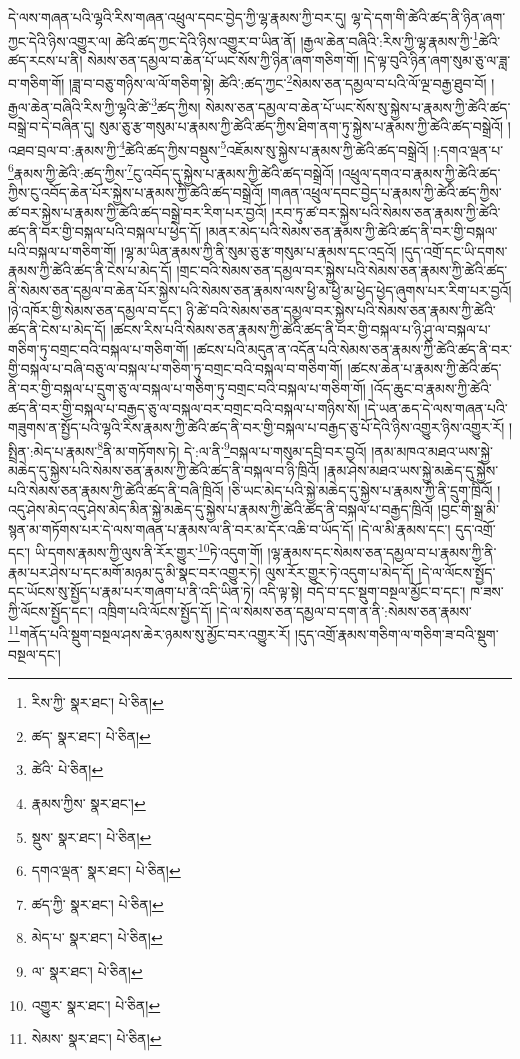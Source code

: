 དེ་ལས་གཞན་པའི་ལྷའི་རིས་གཞན་འཕྲུལ་དབང་བྱེད་ཀྱི་ལྷ་རྣམས་ཀྱི་བར་དུ། ལྷ་དེ་དག་གི་ཚེའི་ཚད་ནི་ཉིན་ཞག་ཀྱང་དེའི་ཉིས་འགྱུར་ལ། ཚེའི་ཚད་ཀྱང་དེའི་ཉིས་འགྱུར་བ་ཡིན་ནོ། །རྒྱལ་ཆེན་བཞིའི་:རིས་ཀྱི་ལྷ་རྣམས་ཀྱི་\footnote{རིས་ཀྱི་  སྣར་ཐང་།  པེ་ཅིན། }ཚེའི་ཚད་རངས་པ་ནི། སེམས་ཅན་དམྱལ་བ་ཆེན་པོ་ཡང་སོས་ཀྱི་ཉིན་ཞག་གཅིག་གོ། །དེ་ལྟ་བུའི་ཉིན་ཞག་སུམ་ཅུ་ལ་ཟླ་བ་གཅིག་གོ། །ཟླ་བ་བཅུ་གཉིས་ལ་ལོ་གཅིག་སྟེ། ཚེའི་:ཚད་ཀྱང་\footnote{ཚད་  སྣར་ཐང་།  པེ་ཅིན། }སེམས་ཅན་དམྱལ་བ་པའི་ལོ་ལྔ་བརྒྱ་ཐུབ་བོ། །རྒྱལ་ཆེན་བཞིའི་རིས་ཀྱི་ལྷའི་ཚེ་\footnote{ཚེའི་  པེ་ཅིན། }ཚད་ཀྱིས། སེམས་ཅན་དམྱལ་བ་ཆེན་པོ་ཡང་སོས་སུ་སྐྱེས་པ་རྣམས་ཀྱི་ཚེའི་ཚད་བསྒྲེ་བ་དེ་བཞིན་དུ། སུམ་ཅུ་རྩ་གསུམ་པ་རྣམས་ཀྱི་ཚེའི་ཚད་ཀྱིས་ཐིག་ནག་ཏུ་སྐྱེས་པ་རྣམས་ཀྱི་ཚེའི་ཚད་བསྒྲེའོ། །འཐབ་བྲལ་བ་:རྣམས་ཀྱི་\footnote{རྣམས་ཀྱིས་  སྣར་ཐང་། }ཚེའི་ཚད་ཀྱིས་བསྡུས་\footnote{སྡུས་  སྣར་ཐང་།  པེ་ཅིན། }འཇོམས་སུ་སྐྱེས་པ་རྣམས་ཀྱི་ཚེའི་ཚད་བསྒྲེའོ། །:དགའ་ལྡན་པ་\footnote{དགའ་ལྡན་  སྣར་ཐང་།  པེ་ཅིན། }རྣམས་ཀྱི་ཚེའི་:ཚད་ཀྱིས་\footnote{ཚད་ཀྱི་  སྣར་ཐང་།  པེ་ཅིན། }ངུ་འབོད་དུ་སྐྱེས་པ་རྣམས་ཀྱི་ཚེའི་ཚད་བསྒྲེའོ། །འཕྲུལ་དགའ་བ་རྣམས་ཀྱི་ཚེའི་ཚད་ཀྱིས་ངུ་འབོད་ཆེན་པོར་སྐྱེས་པ་རྣམས་ཀྱི་ཚེའི་ཚད་བསྒྲེའོ། །གཞན་འཕྲུལ་དབང་བྱེད་པ་རྣམས་ཀྱི་ཚེའི་ཚད་ཀྱིས་ཚ་བར་སྐྱེས་པ་རྣམས་ཀྱི་ཚེའི་ཚད་བསྒྲེ་བར་རིག་པར་བྱའོ། །རབ་ཏུ་ཚ་བར་སྐྱེས་པའི་སེམས་ཅན་རྣམས་ཀྱི་ཚེའི་ཚད་ནི་བར་གྱི་བསྐལ་པའི་བསྐལ་པ་ཕྱེད་དོ། །མནར་མེད་པའི་སེམས་ཅན་རྣམས་ཀྱི་ཚེའི་ཚད་ནི་བར་གྱི་བསྐལ་པའི་བསྐལ་པ་གཅིག་གོ། །ལྷ་མ་ཡིན་རྣམས་ཀྱི་ནི་སུམ་ཅུ་རྩ་གསུམ་པ་རྣམས་དང་འདྲའོ། །དུད་འགྲོ་དང་ཡི་དགས་རྣམས་ཀྱི་ཚེའི་ཚད་ནི་ངེས་པ་མེད་དོ། །གྲང་བའི་སེམས་ཅན་དམྱལ་བར་སྐྱེས་པའི་སེམས་ཅན་རྣམས་ཀྱི་ཚེའི་ཚད་ནི་སེམས་ཅན་དམྱལ་བ་ཆེན་པོར་སྐྱེས་པའི་སེམས་ཅན་རྣམས་ལས་ཕྱི་མ་ཕྱི་མ་ཕྱེད་ཕྱེད་ཞུགས་པར་རིག་པར་བྱའོ། །ཉེ་འཁོར་གྱི་སེམས་ཅན་དམྱལ་བ་དང་། ཉི་ཚེ་བའི་སེམས་ཅན་དམྱལ་བར་སྐྱེས་པའི་སེམས་ཅན་རྣམས་ཀྱི་ཚེའི་ཚད་ནི་ངེས་པ་མེད་དོ། །ཚངས་རིས་པའི་སེམས་ཅན་རྣམས་ཀྱི་ཚེའི་ཚད་ནི་བར་གྱི་བསྐལ་པ་ཉི་ཤུ་ལ་བསྐལ་པ་གཅིག་ཏུ་བགྲང་བའི་བསྐལ་པ་གཅིག་གོ། །ཚངས་པའི་མདུན་ན་འདོན་པའི་སེམས་ཅན་རྣམས་ཀྱི་ཚེའི་ཚད་ནི་བར་གྱི་བསྐལ་པ་བཞི་བཅུ་ལ་བསྐལ་པ་གཅིག་ཏུ་བགྲང་བའི་བསྐལ་བ་གཅིག་གོ། །ཚངས་ཆེན་པ་རྣམས་ཀྱི་ཚེའི་ཚད་ནི་བར་གྱི་བསྐལ་པ་དྲུག་ཅུ་ལ་བསྐལ་པ་གཅིག་ཏུ་བགྲང་བའི་བསྐལ་པ་གཅིག་གོ། །འོད་ཆུང་བ་རྣམས་ཀྱི་ཚེའི་ཚད་ནི་བར་གྱི་བསྐལ་པ་བརྒྱད་ཅུ་ལ་བསྐལ་བར་བགྲང་བའི་བསྐལ་པ་གཉིས་སོ། །དེ་ཡན་ཆད་དེ་ལས་གཞན་པའི་གཟུགས་ན་སྤྱོད་པའི་ལྷའི་རིས་རྣམས་ཀྱི་ཚེའི་ཚད་ནི་བར་གྱི་བསྐལ་པ་བརྒྱད་ཅུ་པོ་དེའི་ཉིས་འགྱུར་ཉིས་འགྱུར་རོ། །སྤྲིན་:མེད་པ་རྣམས་\footnote{མེད་པ་  སྣར་ཐང་།  པེ་ཅིན། }ནི་མ་གཏོགས་ཏེ། དེ་:ལ་ནི་\footnote{ལ་  སྣར་ཐང་།  པེ་ཅིན། }བསྐལ་པ་གསུམ་དབྲི་བར་བྱའོ། །ནམ་མཁའ་མཐའ་ཡས་སྐྱེ་མཆེད་དུ་སྐྱེས་པའི་སེམས་ཅན་རྣམས་ཀྱི་ཚེའི་ཚད་ནི་བསྐལ་བ་ཉི་ཁྲིའོ། །རྣམ་ཤེས་མཐའ་ཡས་སྐྱེ་མཆེད་དུ་སྐྱེས་པའི་སེམས་ཅན་རྣམས་ཀྱི་ཚེའི་ཚད་ནི་བཞི་ཁྲིའོ། །ཅི་ཡང་མེད་པའི་སྐྱེ་མཆེད་དུ་སྐྱེས་པ་རྣམས་ཀྱི་ནི་དྲུག་ཁྲིའོ། །འདུ་ཤེས་མེད་འདུ་ཤེས་མེད་མིན་སྐྱེ་མཆེད་དུ་སྐྱེས་པ་རྣམས་ཀྱི་ཚེའི་ཚད་ནི་བསྐལ་པ་བརྒྱད་ཁྲིའོ། །བྱང་གི་སྒྲ་མི་སྙན་མ་གཏོགས་པར་དེ་ལས་གཞན་པ་རྣམས་ལ་ནི་བར་མ་དོར་འཆི་བ་ཡོད་དོ། །དེ་ལ་མི་རྣམས་དང་། དུད་འགྲོ་དང་། ཡི་དགས་རྣམས་ཀྱི་ལུས་ནི་རོར་གྱུར་\footnote{འགྱུར་  སྣར་ཐང་།  པེ་ཅིན། }ཏེ་འདུག་གོ། །ལྷ་རྣམས་དང་སེམས་ཅན་དམྱལ་བ་པ་རྣམས་ཀྱི་ནི་རྣམ་པར་ཤེས་པ་དང་མགོ་མཉམ་དུ་མི་སྣང་བར་འགྱུར་ཏེ། ལུས་རོར་གྱུར་ཏེ་འདུག་པ་མེད་དོ། །དེ་ལ་ལོངས་སྤྱོད་དང་ཡོངས་སུ་སྤྱོད་པ་རྣམ་པར་གཞག་པ་ནི་འདི་ཡིན་ཏེ། འདི་ལྟ་སྟེ། བདེ་བ་དང་སྡུག་བསྔལ་མྱོང་བ་དང་། ཁ་ཟས་ཀྱི་ལོངས་སྤྱོད་དང་། འཁྲིག་པའི་ལོངས་སྤྱོད་དོ། །དེ་ལ་སེམས་ཅན་དམྱལ་བ་དག་ན་ནི་:སེམས་ཅན་རྣམས་\footnote{སེམས་  སྣར་ཐང་།  པེ་ཅིན། }གནོད་པའི་སྡུག་བསྔལ་ཤས་ཆེར་ཉམས་སུ་མྱོང་བར་འགྱུར་རོ། །དུད་འགྲོ་རྣམས་གཅིག་ལ་གཅིག་ཟ་བའི་སྡུག་བསྔལ་དང་། 